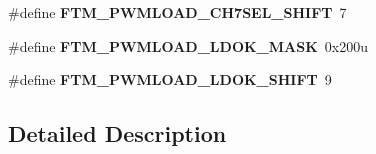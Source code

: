 \begin{DoxyCompactItemize}
\item 
\hypertarget{group___f_t_m___register___masks_ga05ca23b88e7443efc46331367ccb6484}{}\#define {\bfseries F\+T\+M\+\_\+\+P\+W\+M\+L\+O\+A\+D\+\_\+\+C\+H7\+S\+E\+L\+\_\+\+S\+H\+I\+F\+T}~7\label{group___f_t_m___register___masks_ga05ca23b88e7443efc46331367ccb6484}

\item 
\hypertarget{group___f_t_m___register___masks_ga3e984a537814ee8e4130be4e822671d4}{}\#define {\bfseries F\+T\+M\+\_\+\+P\+W\+M\+L\+O\+A\+D\+\_\+\+L\+D\+O\+K\+\_\+\+M\+A\+S\+K}~0x200u\label{group___f_t_m___register___masks_ga3e984a537814ee8e4130be4e822671d4}

\item 
\hypertarget{group___f_t_m___register___masks_ga17e018e9c7812e93d45434bd8db18634}{}\#define {\bfseries F\+T\+M\+\_\+\+P\+W\+M\+L\+O\+A\+D\+\_\+\+L\+D\+O\+K\+\_\+\+S\+H\+I\+F\+T}~9\label{group___f_t_m___register___masks_ga17e018e9c7812e93d45434bd8db18634}

\end{DoxyCompactItemize}


\subsection{Detailed Description}
